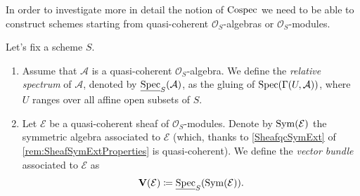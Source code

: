 \noindent
In order to investigate more in detail the notion of $\operatorname{Cospec}$ we need to 
be able to construct schemes starting from quasi-coherent $\mathcal{O}_{ S }$-algebras
or $\mathcal{O}_{ S }$-modules.


\begin{defn}
	Let's fix a scheme $S$.
\begin{enumerate}
	\item Assume that $\mathcal{A}$ is a quasi-coherent $\mathcal{O}_{ S }$-algebra.
		We define the \emph{relative spectrum} of $\mathcal{A}$, denoted by
		$\underline{\operatorname{Spec}}_S(\mathcal{A})$, as the gluing of
		$\operatorname{Spec}(\Gamma(U, \mathcal{A}))$, where $U$ ranges
		over all affine open subsets of $S$.

	\item  Let $\mathcal{E}$ be a quasi-coherent sheaf of $\mathcal{O}_{ S }$-modules.
		Denote by $\operatorname{Sym}(\mathcal{E})$ the symmetric algebra associated to 
		$\mathcal{E}$ (which, thanks to \cref{SheafqcSymExt} of
		\cref{rem:SheafSymExtProperties} is quasi-coherent).
		We define the \emph{vector bundle} associated to $\mathcal{E}$ as
		\begin{equation*}
			\mathbf{V}(\mathcal{E}) \coloneqq
			\underline{\operatorname{Spec}}_S (\operatorname{Sym}(\mathcal{E}))
		.\end{equation*}
\end{enumerate}
\end{defn}


